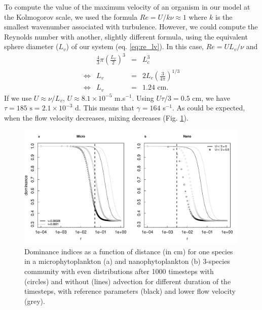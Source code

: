 \documentclass[english]{article}
\begin{document}
To compute the value of the maximum velocity of an organism in our
model at the Kolmogorov scale, we used the formula $Re=U/k\nu\approx1$
where $k$ is the smallest wavenumber associated with turbulence.
However, we could compute the Reynolds number with another, slightly
different formula, using the equivalent sphere diameter ($L_{v}$)
of our system (eq. \ref{eq:re_lv}). In this case, $Re=UL_{v}/\nu$
and
\begin{equation}
\begin{array}{cccc}
 & \frac{4}{3}\pi\left(\frac{L_{v}}{2}\right)^{3} & = & L_{c}^{3}\\
\Leftrightarrow & L_{v} & = & 2L_{c}\left(\frac{3}{4\pi}\right)^{1/3}\\
\Leftrightarrow & L_{v} & = & 1.24\text{ cm}.
\end{array}\label{eq:re_lv}
\end{equation}
If we use $U\approx\nu/L_{v}$, $U\approx8.1\times10^{-5}$ m.s$^{-1}$.
Using $U\tau/3=0.5$ cm, we have $\tau=185\text{ s}=2.1\times10^{-3}$
d. This means that $\gamma=164$ s$^{-1}$. As could be expected,
when the flow velocity decreases, mixing decreases (Fig. \ref{fig:Dominance_advection}).

\begin{figure}[H]
\begin{centering}
\includegraphics[width=0.99\textwidth]{../code/figure/theoretical_dominance_with_adv}
\par\end{centering}
\caption{Dominance indices as a function of distance (in cm) for one species
in a microphytoplankton (a) and nanophytoplankton (b) 3-species community
with even distributions after 1000 timesteps with (circles) and without
(lines) advection for different duration of the timesteps, with reference
parameters (black) and lower flow velocity (grey). \label{fig:Dominance_advection}}

\end{figure}
\end{document}
